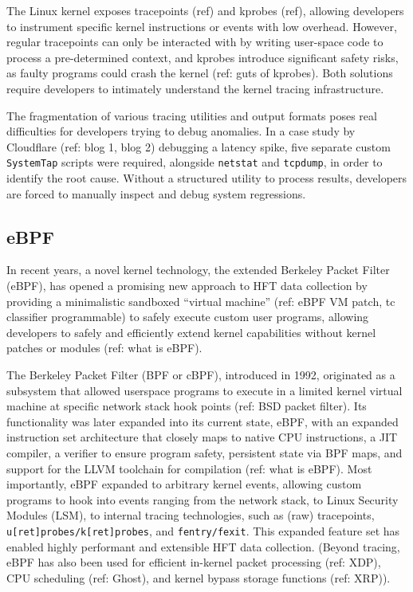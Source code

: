 The Linux kernel exposes tracepoints (ref) and kprobes (ref), allowing developers to instrument
specific kernel instructions or events with low overhead. However, regular tracepoints can only be
interacted with by writing user-space code to process a pre-determined context, and kprobes
introduce significant safety risks, as faulty programs could crash the kernel (ref: guts of
kprobes). Both solutions require developers to intimately understand the kernel tracing
infrastructure.

The fragmentation of various tracing utilities and output formats poses real difficulties for
developers trying to debug anomalies. In a case study by Cloudflare (ref: blog 1, blog 2) debugging
a latency spike, five separate custom \texttt{SystemTap} scripts were required, alongside
\texttt{netstat} and \texttt{tcpdump}, in order to identify the root cause. Without a structured
utility to process results, developers are forced to manually inspect and debug system regressions.

\subsection{eBPF}

In recent years, a novel kernel technology, the extended Berkeley Packet Filter (eBPF), has opened
a promising new approach to HFT data collection by providing a minimalistic sandboxed ``virtual
machine'' (ref: eBPF VM patch, tc classifier programmable) to safely execute custom user programs,
allowing developers to safely and efficiently extend kernel capabilities without kernel patches or
modules (ref: what is eBPF).

The Berkeley Packet Filter (BPF or cBPF), introduced in 1992, originated as a subsystem that allowed
userspace programs to execute in a limited kernel virtual machine at specific network stack hook
points (ref: BSD packet filter). Its functionality was later expanded into its current state, eBPF,
with an expanded instruction set architecture that closely maps to native CPU instructions, a JIT
compiler, a verifier to ensure program safety, persistent state via BPF maps, and support for the
LLVM toolchain for compilation (ref: what is eBPF). Most importantly, eBPF expanded to arbitrary
kernel events, allowing custom programs to hook into events ranging from the network stack, to Linux
Security Modules (LSM), to internal tracing technologies, such as (raw) tracepoints,
\texttt{u[ret]probes/k[ret]probes}, and \texttt{fentry/fexit}. This expanded feature set has enabled
highly performant and extensible HFT data collection. (Beyond tracing, eBPF has also been used for
efficient in-kernel packet processing (ref: XDP), CPU scheduling (ref: Ghost), and kernel bypass
storage functions (ref: XRP)).


